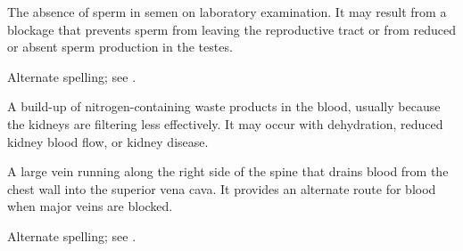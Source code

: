  The absence of sperm in semen on laboratory examination. It may result from a blockage that prevents sperm from leaving the reproductive tract or from reduced or absent sperm production in the testes.

 Alternate spelling; see .

 A build-up of nitrogen-containing waste products in the blood, usually because the kidneys are filtering less effectively. It may occur with dehydration, reduced kidney blood flow, or kidney disease.

 A large vein running along the right side of the spine that drains blood from the chest wall into the superior vena cava. It provides an alternate route for blood when major veins are blocked.

 Alternate spelling; see .
